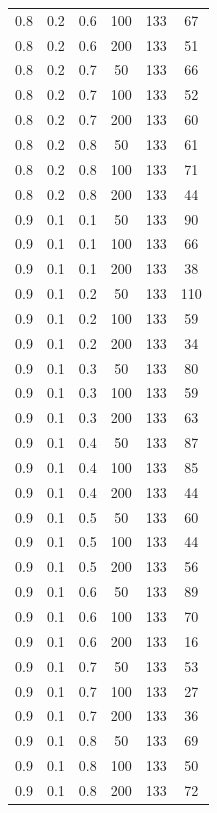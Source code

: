 \documentclass[a4paper,14pt, unknownkeysallowed]{extreport}
\begin{document}
\begin{center}
\begin{longtable}[c]{|c|c|c|c|c|c|}
         0.8 &  0.2 &  0.6 &  100 &   133 &    67 \\
         0.8 &  0.2 &  0.6 &  200 &   133 &    51 \\
        \hline
         0.8 &  0.2 &  0.7 &   50 &   133 &    66 \\
         0.8 &  0.2 &  0.7 &  100 &   133 &    52 \\
         0.8 &  0.2 &  0.7 &  200 &   133 &    60 \\
        \hline
         0.8 &  0.2 &  0.8 &   50 &   133 &    61 \\
         0.8 &  0.2 &  0.8 &  100 &   133 &    71 \\
         0.8 &  0.2 &  0.8 &  200 &   133 &    44 \\
        \hline
         0.9 &  0.1 &  0.1 &   50 &   133 &    90 \\
         0.9 &  0.1 &  0.1 &  100 &   133 &    66 \\
         0.9 &  0.1 &  0.1 &  200 &   133 &    38 \\
        \hline
         0.9 &  0.1 &  0.2 &   50 &   133 &   110 \\
         0.9 &  0.1 &  0.2 &  100 &   133 &    59 \\
         0.9 &  0.1 &  0.2 &  200 &   133 &    34 \\
        \hline
         0.9 &  0.1 &  0.3 &   50 &   133 &    80 \\
         0.9 &  0.1 &  0.3 &  100 &   133 &    59 \\
         0.9 &  0.1 &  0.3 &  200 &   133 &    63 \\
        \hline
         0.9 &  0.1 &  0.4 &   50 &   133 &    87 \\
         0.9 &  0.1 &  0.4 &  100 &   133 &    85 \\
         0.9 &  0.1 &  0.4 &  200 &   133 &    44 \\
        \hline
         0.9 &  0.1 &  0.5 &   50 &   133 &    60 \\
         0.9 &  0.1 &  0.5 &  100 &   133 &    44 \\
         0.9 &  0.1 &  0.5 &  200 &   133 &    56 \\
        \hline
         0.9 &  0.1 &  0.6 &   50 &   133 &    89 \\
         0.9 &  0.1 &  0.6 &  100 &   133 &    70 \\
         0.9 &  0.1 &  0.6 &  200 &   133 &    16 \\
        \hline
         0.9 &  0.1 &  0.7 &   50 &   133 &    53 \\
         0.9 &  0.1 &  0.7 &  100 &   133 &    27 \\
         0.9 &  0.1 &  0.7 &  200 &   133 &    36 \\
        \hline
         0.9 &  0.1 &  0.8 &   50 &   133 &    69 \\
         0.9 &  0.1 &  0.8 &  100 &   133 &    50 \\
         0.9 &  0.1 &  0.8 &  200 &   133 &    72 \\
        \hline

\end{longtable}
\end{center}
\end{document}

